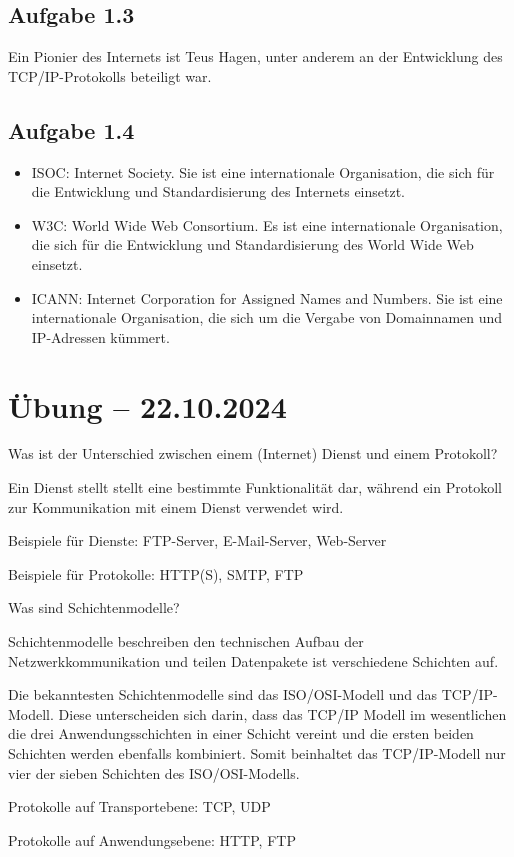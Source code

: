 \documentclass[11pt]{article}
\begin{document}
\subsection{Aufgabe 1.3}
Ein Pionier des Internets ist Teus Hagen, unter anderem an der Entwicklung des TCP/IP-Protokolls beteiligt
war.

\subsection{Aufgabe 1.4}
\begin{itemize}
  \item ISOC: Internet Society. Sie ist eine internationale Organisation, die sich für die Entwicklung und
        Standardisierung des Internets einsetzt.
  \item W3C: World Wide Web Consortium. Es ist eine internationale Organisation, die sich für die Entwicklung und
        Standardisierung des World Wide Web einsetzt.
  \item ICANN: Internet Corporation for Assigned Names and Numbers. Sie ist eine internationale Organisation, die sich
        um die Vergabe von Domainnamen und IP-Adressen kümmert.
\end{itemize}

\section{Übung -- 22.10.2024}
\begin{aufgabe}
  Was ist der Unterschied zwischen einem (Internet) Dienst und einem Protokoll?

  Ein Dienst stellt stellt eine bestimmte Funktionalität dar, während ein Protokoll zur Kommunikation mit einem Dienst
  verwendet wird.

  Beispiele für Dienste: FTP-Server, E-Mail-Server, Web-Server

  Beispiele für Protokolle: HTTP(S), SMTP, FTP
\end{aufgabe}

\begin{aufgabe}
  Was sind Schichtenmodelle?

  Schichtenmodelle beschreiben den technischen Aufbau der Netzwerkkommunikation und teilen Datenpakete ist verschiedene
  Schichten auf.

  Die bekanntesten Schichtenmodelle sind das ISO/OSI-Modell und das TCP/IP-Modell. Diese unterscheiden sich darin, dass
  das TCP/IP Modell im wesentlichen die drei Anwendungsschichten in einer Schicht vereint und die ersten beiden Schichten
  werden ebenfalls kombiniert. Somit beinhaltet das TCP/IP-Modell nur vier der sieben Schichten des ISO/OSI-Modells.

  Protokolle auf Transportebene: TCP, UDP

  Protokolle auf Anwendungsebene: HTTP, FTP
\end{aufgabe}
\end{document}
